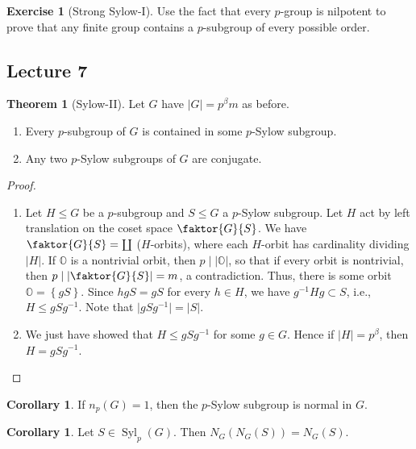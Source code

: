 \documentclass[10pt,letterpaper,cm]{nupset}
\theoremstyle{definition}
\theoremstyle{theorem}
\newtheorem{theorem}[definition]{Theorem}
\newtheorem{corollary}[definition]{Corollary}
\newtheorem{exercise}[definition]{Exercise}
\theoremstyle{remark}
\newcommand{\1}{\mathbf{1}}
\newcommand{\0}{\vec 0}
\DeclareMathOperator{\Syl}{Syl}
\begin{document}
\begin{exercise}[Strong Sylow-I]
Use the fact that every $p$-group is nilpotent to prove that any finite group contains a $p$-subgroup of every possible order.
\end{exercise}

\subsection{Lecture 7}

\begin{theorem}[Sylow-II] Let $G$ have $\lvert{G}\rvert= p^{\beta}m$ as before.
\begin{enumerate}
\item Every $p$-subgroup of $G$ is contained in some $p$-Sylow subgroup.
\item Any two $p$-Sylow subgroups of $G$ are conjugate.
\end{enumerate}
\end{theorem}

\begin{proof} $ $
\begin{enumerate}
\item Let $H\leq G$ be a $p$-subgroup and $S\leq G$ a $p$-Sylow subgroup.  Let $H$ act by left translation on the coset space $\faktor{G}{S}$. We have $\faktor{G}{S} = \coprod$ ($H$-orbits), where each $H$-orbit has cardinality dividing $\lvert{H}\rvert$. If $\mathds{O}$ is a nontrivial orbit, then $p\mid \lvert{\mathds{O}}\rvert$, so that if every orbit is nontrivial, then $p\mid \lvert{\faktor{G}{S}}\rvert =m$, a contradiction. Thus, there is some orbit $\mathds{O} = \left\{gS\right\}$. Since $hgS = gS$ for every $h\in H$, we have $g^{-1}Hg\subset S$, i.e., $H\leq gSg^{-1}$. Note that $\lvert{gSg^{-1}}\rvert=\lvert{S}\rvert$.
\item We just have showed that $H\leq gSg^{-1}$ for some $g\in G$. Hence if $\lvert{H}\rvert = p^{\beta}$, then $H=gSg^{-1}$.
\end{enumerate}
\end{proof}

\begin{corollary}
If $n_p(G)=1$, then the $p$-Sylow subgroup is normal in $G$.
\end{corollary}

\begin{corollary}
Let $S\in \Syl_p(G)$. Then $N_G(N_G(S)) = N_G(S)$.
\end{corollary}
\end{document}
